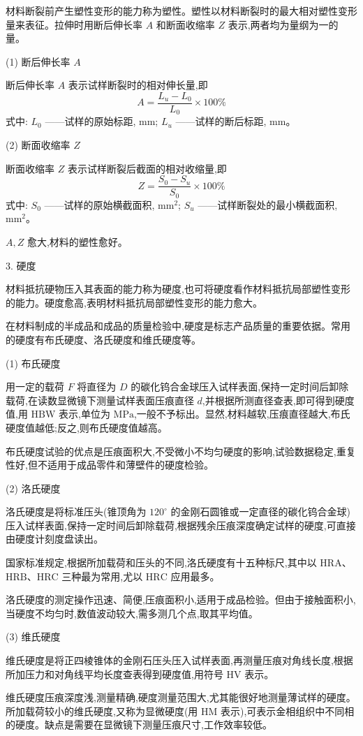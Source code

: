 \documentclass[UTF8]{ctexbook}
\newcommand{\◎}{\ensuremath{\bigcirc}}
\begin{document}
材料断裂前产生塑性变形的能力称为塑性。塑性以材料断裂时的最大相对塑性变形量来表征。拉伸时用断后伸长率 $A$ 和断面收缩率 $Z$ 表示,两者均为量纲为一的量。

(1) 断后伸长率 $A$

断后伸长率 $A$ 表示试样断裂时的相对伸长量,即
\[
A = \frac{L_u - L_0}{L_0} \times 100\%
\]
式中: $L_0$ ——试样的原始标距, $\text{mm}$;
$L_u$ ——试样的断后标距, $\text{mm}$。

(2) 断面收缩率 $Z$

断面收缩率 $Z$ 表示试样断裂后截面的相对收缩量,即
\[
Z = \frac{S_0 - S_u}{S_0} \times 100\%
\]
式中: $S_0$ ——试样的原始横截面积, $\text{mm}^2$;
$S_u$ ——试样断裂处的最小横截面积, $\text{mm}^2$。

$A, Z$ 愈大,材料的塑性愈好。

3. 硬度

材料抵抗硬物压入其表面的能力称为硬度,也可将硬度看作材料抵抗局部塑性变形的能力。硬度愈高,表明材料抵抗局部塑性变形的能力愈大。

在材料制成的半成品和成品的质量检验中,硬度是标志产品质量的重要依据。常用的硬度有布氏硬度、洛氏硬度和维氏硬度等。

(1) 布氏硬度

用一定的载荷 $F$ 将直径为 $D$ 的碳化钨合金球压入试样表面,保持一定时间后卸除载荷,在读数显微镜下测量试样表面压痕直径 $d$,并根据所测直径查表,即可得到硬度值,用 $\text{HBW}$ 表示,单位为 $\text{MPa}$,一般不予标出。显然,材料越软,压痕直径越大,布氏硬度值越低;反之,则布氏硬度值越高。

布氏硬度试验的优点是压痕面积大,不受微小不均匀硬度的影响,试验数据稳定,重复性好,但不适用于成品零件和薄壁件的硬度检验。

(2) 洛氏硬度

洛氏硬度是将标准压头(锥顶角为 $120^\circ$ 的金刚石圆锥或一定直径的碳化钨合金球)压入试样表面,保持一定时间后卸除载荷,根据残余压痕深度确定试样的硬度,可直接由硬度计刻度盘读出。

国家标准规定,根据所加载荷和压头的不同,洛氏硬度有十五种标尺,其中以 $\text{HRA}$、$\text{HRB}$、$\text{HRC}$ 三种最为常用,尤以 $\text{HRC}$ 应用最多。

洛氏硬度的测定操作迅速、简便,压痕面积小,适用于成品检验。但由于接触面积小,当硬度不均匀时,数值波动较大,需多测几个点,取其平均值。

(3) 维氏硬度

维氏硬度是将正四棱锥体的金刚石压头压入试样表面,再测量压痕对角线长度,根据所加压力和对角线平均长度查表得到硬度值,用符号 $\text{HV}$ 表示。

维氏硬度压痕深度浅,测量精确,硬度测量范围大,尤其能很好地测量薄试样的硬度。所加载荷较小的维氏硬度,又称为显微硬度(用 $\text{HM}$ 表示),可表示金相组织中不同相的硬度。缺点是需要在显微镜下测量压痕尺寸,工作效率较低。
\end{document}
